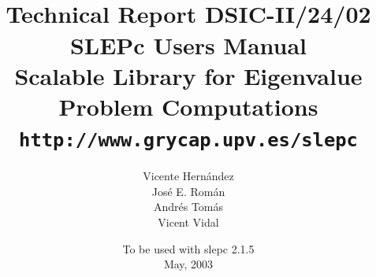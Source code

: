 \documentclass[titlepage,10pt,a4paper]{slepc}
\newcommand{\slepcversion}{2.1.5}
\newcommand{\packnoi}[1]{{\sc #1}\xspace}
\newcommand{\slepc}{\packnoi{slep\rm c}}
\newcommand{\slepchome}{http://www.grycap.upv.es/slepc}
\newcommand{\url}[1]{\texttt{#1}}
\begin{document}
\title{
 	\vspace*{-1cm}
	\\[2cm]
	\normalsize Technical Report DSIC-II/24/02
	\\[2cm]
	\vspace*{6mm}
	{\Large\bf\sffamily 
	SLEPc Users Manual\\[2mm]}
	{\large\bf\sffamily 
	Scalable Library for Eigenvalue Problem Computations}\\[2mm]
	\vspace*{6mm}
	\vspace*{6mm}
	\url{\slepchome}
	\\[6mm]
}

\author{
	Vicente Hern\'andez
	\\
	Jos\'e E. Rom\'an
	\\
	Andr\'es Tom\'as
	\\
	Vicent Vidal
	\\[2cm]
}

\date{
	To be used with \slepc \slepcversion\\
	May, 2003
}

{
\pagestyle{empty}
\maketitle
}

\setlength{\textheight}{14.99cm}
\setlength{\footskip}{2cm}
\setlength{\voffset}{2.3cm}

\pagestyle{empty}
\cleardoublepage
\end{document}
